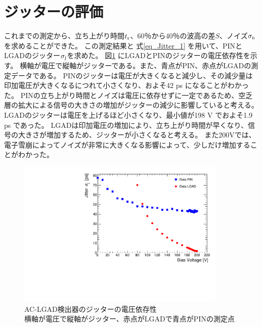 \section{ジッターの評価}
これまでの測定から、立ち上がり時間$t_{\rm{r}}$、60％から40％の波高の差$S$、ノイズ$\sigma_{\rm{n}}$を求めることができた。
この測定結果と 式\ref{eq_Jitter_1} を用いて、PINとLGADのジッター$\sigma_{\rm{j}}$を求めた。
 図\ref{fg:JittervsBias} にLGADとPINのジッターの電圧依存性を示す。
横軸が電圧で縦軸がジッターである。また、青点がPIN、赤点がLGADの測定データである。
PINのジッターは電圧が大きくなると減少し、その減少量は印加電圧が大きくなるにつれて小さくなり、およそ42 ps になることがわかった。
PINの立ち上がり時間とノイズは電圧に依存せずに一定であるため、空乏層の拡大による信号の大きさの増加がジッターの減少に影響していると考える。
LGADのジッターは電圧を上げるほど小さくなり、最小値が198 V でおよそ1.9 ps であった。
LGADは印加電圧の増加により、立ち上がり時間が早くなり、信号の大きさが増加するため、ジッターが小さくなると考える。
また200Vでは、電子雪崩によってノイズが非常に大きくなる影響によって、少しだけ増加することがわかった。

\begin{figure}[h]
    \centering
    \includegraphics[width=10cm]{fig/graph/JittervsVoltage.pdf}
    \caption[AC-LGAD検出器のジッターの電圧依存性]{AC-LGAD検出器のジッターの電圧依存性\\横軸が電圧で縦軸がジッター、赤点がLGADで青点がPINの測定点}
    \label{fg:JittervsBias}
\end{figure}

